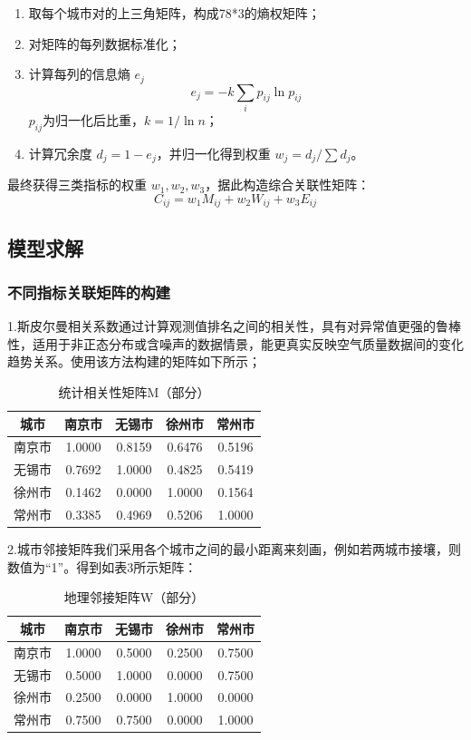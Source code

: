 \documentclass[a4paper,12pt]{article}
\begin{document}
	\begin{enumerate}
		\item 取每个城市对的上三角矩阵，构成78*3的熵权矩阵；
		\item 对矩阵的每列数据标准化；
		\item 计算每列的信息熵 $e_j$
			\begin{equation}
		e_j = -k \sum_i p_{ij} \ln p_{ij}
		\end{equation}
		$p_{ij}$为归一化后比重，$k = 1/\ln n$；
		\item 计算冗余度 $d_j = 1 - e_j$，并归一化得到权重 $w_j = d_j / \sum d_j$。
	\end{enumerate}
	
	最终获得三类指标的权重 $w_1, w_2, w_3$，据此构造综合关联性矩阵：
	\begin{equation}
		C_{ij} = w_1 M_{ij} + w_2 W_{ij} + w_3 E_{ij}
	\end{equation}
	
	\subsection{模型求解}
	\subsubsection{不同指标关联矩阵的构建}
	
	1.斯皮尔曼相关系数通过计算观测值排名之间的相关性，具有对异常值更强的鲁棒性，适用于非正态分布或含噪声的数据情景，能更真实反映空气质量数据间的变化趋势关系。使用该方法构建的矩阵如下所示；
	\begin{table}[h]
		\centering
		\caption{统计相关性矩阵M（部分）}
		\begin{tabular}{ccccc}
			\toprule
			城市 & 南京市 & 无锡市 & 徐州市 & 常州市 \\
			\midrule
			南京市 & 1.0000 & 0.8159 & 0.6476 & 0.5196 \\
			无锡市 & 0.7692 & 1.0000 & 0.4825 & 0.5419 \\
			徐州市 & 0.1462 & 0.0000 & 1.0000 & 0.1564 \\
			常州市 & 0.3385 & 0.4969 & 0.5206 & 1.0000 \\
			\bottomrule
		\end{tabular}
	\end{table}
	
	2.城市邻接矩阵我们采用各个城市之间的最小距离来刻画，例如若两城市接壤，则数值为“1”。得到如表3所示矩阵：
	
	\begin{table}[h]
		\centering
		\caption{地理邻接矩阵W（部分）}
		\begin{tabular}{ccccc}
			\toprule
			城市 & 南京市 & 无锡市 & 徐州市 & 常州市 \\
			\midrule
			南京市 & 1.0000 & 0.5000 & 0.2500 & 0.7500 \\
			无锡市 & 0.5000 & 1.0000 & 0.0000 & 0.7500 \\
			徐州市 & 0.2500 & 0.0000 & 1.0000 & 0.0000 \\
			常州市 & 0.7500 & 0.7500 & 0.0000 & 1.0000 \\
			\bottomrule
		\end{tabular}
	\end{table}
	
\end{document}
